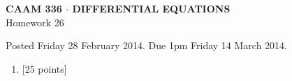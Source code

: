 \documentclass[10pt]{article}
\begin{document}
\vspace*{-5em}
\begin{center}
\large \textsf{\textbf{CAAM 336 $\cdot$ DIFFERENTIAL EQUATIONS}\\[0.5em]
Homework 26 }
\end{center}

Posted Friday 28 February 2014. Due 1pm Friday 14 March 2014.

\begin{enumerate}\addtocounter{enumi}{25}
\item {[25 points]}  
\end{enumerate}
\end{document}
